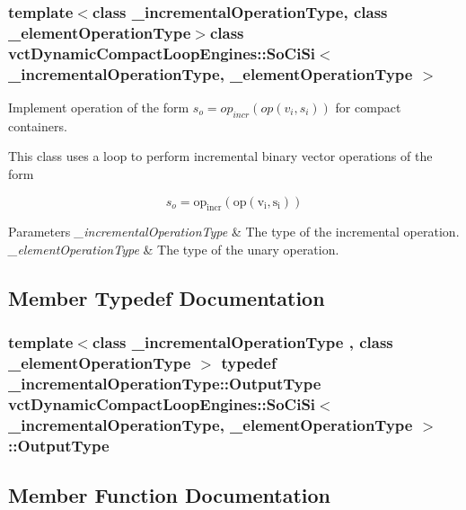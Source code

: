 \subsubsection*{template$<$class \+\_\+incremental\+Operation\+Type, class \+\_\+element\+Operation\+Type$>$class vct\+Dynamic\+Compact\+Loop\+Engines\+::\+So\+Ci\+Si$<$ \+\_\+incremental\+Operation\+Type, \+\_\+element\+Operation\+Type $>$}

Implement operation of the form $s_o = op_{incr}(op(v_i, s_i))$ for compact containers. 

This class uses a loop to perform incremental binary vector operations of the form

\[ s_o = \mathrm{op_{incr}(\mathrm{op}(v_i, s_i))} \]


\begin{DoxyParams}{Parameters}
{\em \+\_\+incremental\+Operation\+Type} & The type of the incremental operation.\\
\hline
{\em \+\_\+element\+Operation\+Type} & The type of the unary operation. \\
\hline
\end{DoxyParams}


\subsection{Member Typedef Documentation}
\hypertarget{classvct_dynamic_compact_loop_engines_1_1_so_ci_si_a2a36b75e6bf3d9b8dd1db23d5e5f8453}{}
\subsubsection[{Output\+Type}]{\setlength{\rightskip}{0pt plus 5cm}template$<$class \+\_\+incremental\+Operation\+Type , class \+\_\+element\+Operation\+Type $>$ typedef \+\_\+incremental\+Operation\+Type\+::\+Output\+Type {\bf vct\+Dynamic\+Compact\+Loop\+Engines\+::\+So\+Ci\+Si}$<$ \+\_\+incremental\+Operation\+Type, \+\_\+element\+Operation\+Type $>$\+::{\bf Output\+Type}}\label{classvct_dynamic_compact_loop_engines_1_1_so_ci_si_a2a36b75e6bf3d9b8dd1db23d5e5f8453}


\subsection{Member Function Documentation}
\hypertarget{classvct_dynamic_compact_loop_engines_1_1_so_ci_si_a69811ed93c34489c3c2bbbe2bac9d34d}{}
